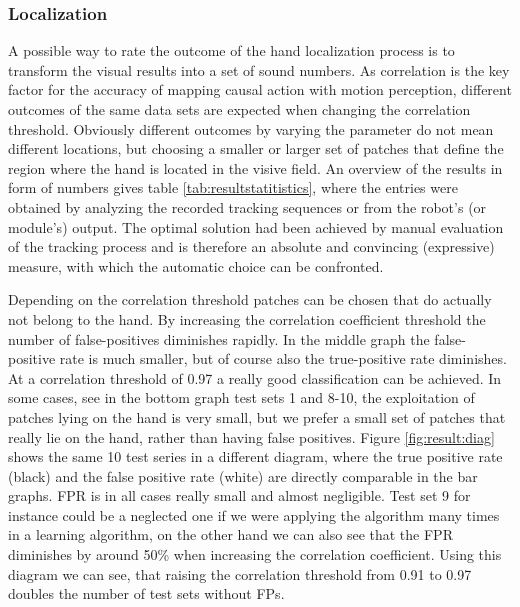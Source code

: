 \documentclass[conference]{IEEEtran}
\begin{document}
\subsubsection{Localization}
\label{results:evaluation:localization}
%
A possible way to rate the outcome of the hand localization process is to transform the visual results into a set of sound numbers. As correlation is the key factor for the accuracy of mapping causal action with motion perception, different outcomes of the same data sets are expected when changing the correlation threshold. Obviously different outcomes by varying the parameter do not mean different locations, but choosing a smaller or larger set of patches that define the region where the hand is located in the visive field. An overview of the results in form of numbers gives table \ref{tab:resultstatitistics}, where the entries were obtained by analyzing the recorded tracking sequences or from the robot's (or module's) output. 
%
The optimal solution had been achieved by manual evaluation of the tracking process and is therefore an absolute and convincing (expressive) measure, with which the automatic choice can be confronted. 

Depending on the correlation threshold patches can be chosen that do actually not belong to the hand. By increasing the correlation coefficient threshold the number of false-positives diminishes rapidly. In the middle graph the false-positive rate is much smaller, but of course also the true-positive rate diminishes. At a correlation threshold of 0.97 a really good classification can be achieved. In some cases, see in the bottom graph test sets 1 and 8-10, the exploitation of patches lying on the hand is very small, but we prefer a small set of patches that really lie on the hand, rather than having false positives. Figure \ref{fig:result:diag} shows the same 10 test series in a different diagram, where the true positive rate (black) and the false positive rate (white) are directly comparable in the bar graphs. FPR is in all cases really small and almost negligible. Test set 9 for instance could be a neglected one if we were applying the algorithm many times in a learning algorithm, on the other hand we can also see that the FPR diminishes by around 50\% when increasing the correlation coefficient. Using this diagram we can see, that raising the correlation threshold from 0.91 to 0.97 doubles the number of test sets without FPs. 
\end{document}
